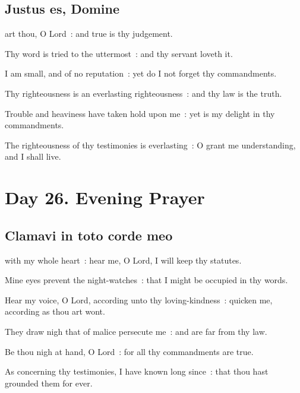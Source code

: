 \subsection{Justus es, Domine}
 art thou, O Lord~: and true is thy judgement.\par
{}
Thy word is tried to the uttermost~: and thy servant loveth it.\par
{}I am small, and of no reputation~: yet do I not forget thy commandments.\par
{}Thy righteousness is an everlasting righteousness~: and thy law is the truth.\par
{}Trouble and heaviness have taken hold upon me~: yet is my delight in thy commandments.\par
{}The righteousness of thy testimonies is everlasting~: O grant me understanding, and I shall live.\par

\section*{Day 26. Evening Prayer}

\subsection{Clamavi in toto corde meo}
 with my whole heart~: hear me, O Lord, I will keep thy statutes.\par
{}
Mine eyes prevent the night-watches~: that I might be occupied in thy words.\par
{}Hear my voice, O Lord, according unto thy loving-kindness~: quicken me, according as thou art wont.\par
{}They draw nigh that of malice persecute me~: and are far from thy law.\par
{}Be thou nigh at hand, O Lord~: for all thy commandments are true.\par
{}As concerning thy testimonies, I have known long since~: that thou hast grounded them for ever.\par

